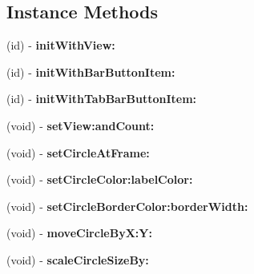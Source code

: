 \subsection*{Instance Methods}
\begin{DoxyCompactItemize}
\item 
\mbox{\label{interface_r_k_notification_hub_abeb9ba20927132526605430186b5ff37}} 
(id) -\/ {\bfseries init\+With\+View\+:}
\item 
\mbox{\label{interface_r_k_notification_hub_ab71f752e8bf9e48eed835ed86baf3b24}} 
(id) -\/ {\bfseries init\+With\+Bar\+Button\+Item\+:}
\item 
\mbox{\label{interface_r_k_notification_hub_af65e3b60f2eddc01898f613201862d2d}} 
(id) -\/ {\bfseries init\+With\+Tab\+Bar\+Button\+Item\+:}
\item 
\mbox{\label{interface_r_k_notification_hub_a8eb808bbdee9186b39a25854101d1bd0}} 
(void) -\/ {\bfseries set\+View\+:and\+Count\+:}
\item 
\mbox{\label{interface_r_k_notification_hub_a99f6413af7ef4cafa43ac024010d4d8f}} 
(void) -\/ {\bfseries set\+Circle\+At\+Frame\+:}
\item 
\mbox{\label{interface_r_k_notification_hub_ae6a9e1902cd6983ec8155fae4451fea5}} 
(void) -\/ {\bfseries set\+Circle\+Color\+:label\+Color\+:}
\item 
\mbox{\label{interface_r_k_notification_hub_a944d4ffcef9134fc76ecabda2ff55798}} 
(void) -\/ {\bfseries set\+Circle\+Border\+Color\+:border\+Width\+:}
\item 
\mbox{\label{interface_r_k_notification_hub_ae4e06b9de4a5f76b3cc34c2cd26d4a80}} 
(void) -\/ {\bfseries move\+Circle\+By\+X\+:\+Y\+:}
\item 
\mbox{\label{interface_r_k_notification_hub_ad5bce51115196f753402ae3c0f68d23e}} 
(void) -\/ {\bfseries scale\+Circle\+Size\+By\+:}
\item 

\end{DoxyCompactItemize}
